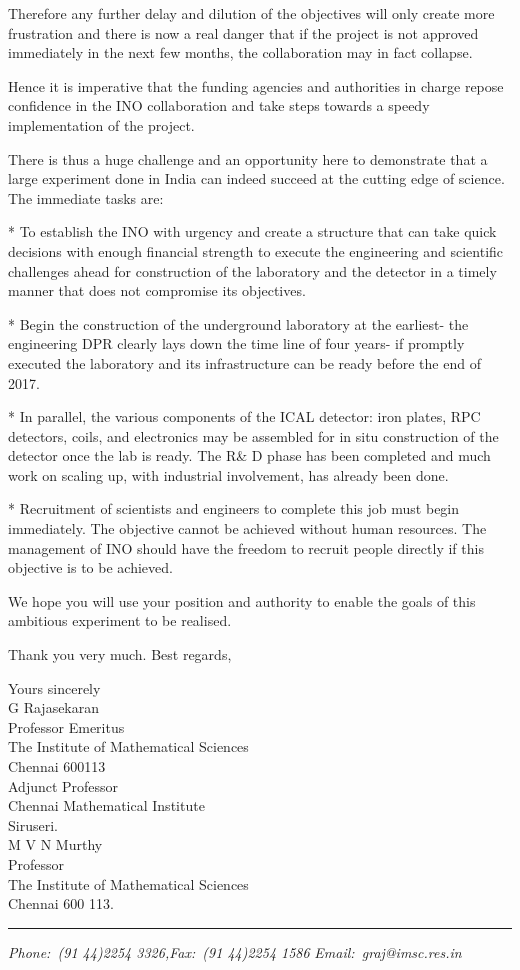 Therefore any further delay and dilution of the objectives will only
create more frustration and there is now a real danger that if the project
is not approved immediately in the next few months, the collaboration may
in fact collapse.

Hence it is imperative that the funding agencies and authorities in charge
repose confidence in the INO collaboration and take steps towards a speedy
implementation of the project.

There is thus a huge challenge and an opportunity here to demonstrate that
a large experiment done in India can indeed succeed at the cutting edge of
science. The immediate tasks are:

* To establish the INO with urgency and create a structure that can take
quick decisions with enough financial strength to execute the engineering
and scientific challenges ahead for construction of the laboratory and the
detector in a timely manner that does not compromise its objectives.

* Begin the construction of the underground laboratory at the earliest-
the engineering DPR clearly lays down the time line of four years- if
promptly executed the laboratory and its infrastructure can be ready
before the end of 2017.

* In parallel, the various components of the ICAL detector: iron plates,
RPC detectors, coils, and electronics may be assembled for in situ
construction of the detector once the lab is ready. The R\& D phase has
been completed and much work on scaling up, with industrial involvement,
has already been done.

* Recruitment of scientists and engineers to complete this job must begin
immediately. The objective cannot be achieved without human resources.
The management of INO should have the freedom to recruit people directly
if this objective is to be achieved.

We hope you will use your position and authority to enable the goals of
this ambitious experiment to be realised.

Thank you very much. Best regards,

\begin{flushleft}

Yours sincerely\\[1.5cm]

G Rajasekaran\\
Professor Emeritus\\
The Institute of Mathematical Sciences\\
Chennai 600113\\
Adjunct Professor\\
Chennai Mathematical Institute\\
Siruseri.\\
\vskip 1cm 
M V N Murthy\\
Professor\\
The Institute of Mathematical Sciences\\
Chennai 600 113.\\
\end{flushleft}




\vfill

\hrule
\begin{flushleft}
{\sl Phone:~(91 44)2254 3326,\hfill Fax:~(91 44)2254 
1586}\hfill
{\sl Email:~graj@imsc.res.in} 
\end{flushleft}

%


